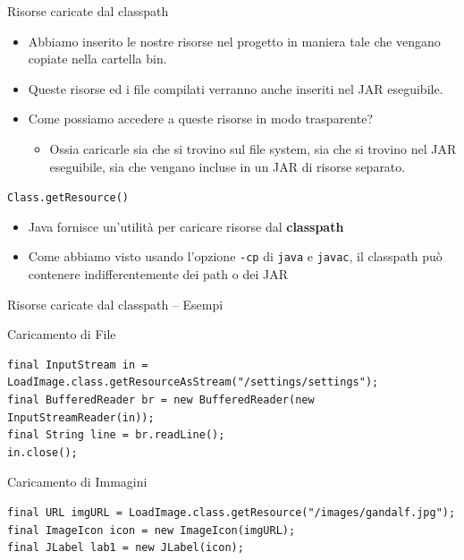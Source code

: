 \documentclass[presentation]{beamer}
\begin{document}
\begin{frame}{Risorse caricate dal classpath}
\begin{itemize}
\item Abbiamo inserito le nostre risorse nel progetto in maniera tale che vengano copiate nella cartella bin.
\item Queste risorse ed i file compilati verranno anche inseriti nel JAR eseguibile.
\item Come possiamo accedere a queste risorse in modo trasparente?
\begin{itemize}
\item Ossia caricarle sia che si trovino sul file system, sia che si trovino nel JAR eseguibile, sia che vengano incluse in un JAR di risorse separato.
\end{itemize} 
\end{itemize}
\begin{block}{\texttt{Class.getResource()}}
\begin{itemize}
\item Java fornisce un'utilità per caricare risorse dal \textbf{classpath}
\item Come abbiamo visto usando l'opzione \texttt{-cp} di \texttt{java} e \texttt{javac}, il classpath può contenere indifferentemente dei path o dei JAR
\end{itemize}
\end{block}
\end{frame}

\begin{frame}[fragile]{Risorse caricate dal classpath -- Esempi}

\begin{block}{Caricamento di File}
\begin{lstlisting}
final InputStream in = LoadImage.class.getResourceAsStream("/settings/settings");
final BufferedReader br = new BufferedReader(new InputStreamReader(in));
final String line = br.readLine();
in.close();
\end{lstlisting}
\end{block}

\begin{block}{Caricamento di Immagini}
\begin{lstlisting}
final URL imgURL = LoadImage.class.getResource("/images/gandalf.jpg");
final ImageIcon icon = new ImageIcon(imgURL);
final JLabel lab1 = new JLabel(icon);
\end{lstlisting}
\end{block}
\end{frame}
\end{document}
